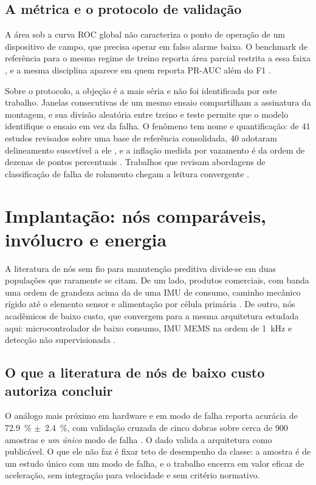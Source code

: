 \subsection{A métrica e o protocolo de validação}

A área sob a curva ROC global não caracteriza o ponto de operação de um dispositivo de
campo, que precisa operar em falso alarme baixo. O benchmark de referência para o mesmo
regime de treino reporta área parcial restrita a essa faixa \cite{koizumi2020}, e a mesma
disciplina aparece em quem reporta PR-AUC além do F1 \cite{brito2022}.

Sobre o protocolo, a objeção é a mais séria e não foi identificada por este trabalho.
Janelas consecutivas de um mesmo ensaio compartilham a assinatura da montagem, e sua
divisão aleatória entre treino e teste permite que o modelo identifique o ensaio em vez da
falha. O fenômeno tem nome e quantificação: de \num{41} estudos revisados sobre uma base de
referência consolidada, \num{40} adotaram delineamento suscetível a ele \cite{varejao2025},
e a inflação medida por vazamento é da ordem de dezenas de pontos percentuais
\cite{vieira2026}. Trabalhos que revisam abordagens de classificação de falha de rolamento
chegam a leitura convergente \cite{abburi2023,smith2015}.

\section{Implantação: nós comparáveis, invólucro e energia}
\label{sec:rev-implantacao}

A literatura de nós sem fio para manutenção preditiva divide-se em duas populações que
raramente se citam. De um lado, produtos comerciais, com banda uma ordem de grandeza acima
da de uma IMU de consumo, caminho mecânico rígido até o elemento sensor e alimentação por
célula primária \cite{bentlynevada2025,erbessd2025,tractian2022}. De outro, nós acadêmicos
de baixo custo, que convergem para a mesma arquitetura estudada aqui: microcontrolador de
baixo consumo, IMU MEMS na ordem de \SI{1}{\kilo\hertz} e detecção não supervisionada
\cite{kolok2025,antonini2023,bisio2025}.

\subsection{O que a literatura de nós de baixo custo autoriza concluir}

O análogo mais próximo em hardware e em modo de falha reporta acurácia de
\SI{72,9}{\percent} $\pm$~\SI{2,4}{\percent}, com validação cruzada de cinco dobras sobre
cerca de \num{900} amostras e \emph{um único} modo de falha \cite{kolok2025}. O dado valida
a arquitetura como publicável. O que ele não faz é fixar teto de desempenho da classe: a
amostra é de um estudo único com um modo de falha, e o trabalho encerra em valor eficaz de
aceleração, sem integração para velocidade e sem critério normativo.

